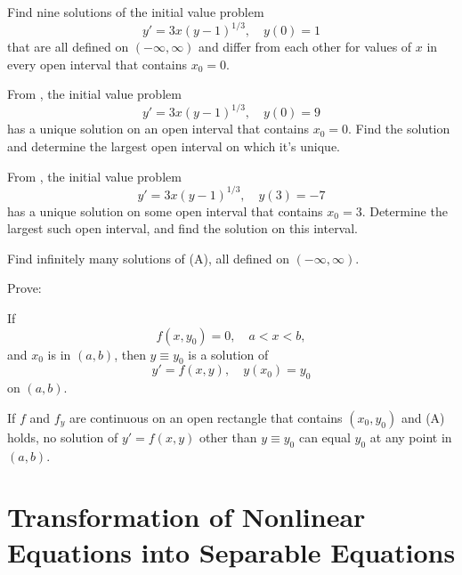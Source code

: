 \begin{exerciselist}
\item\label{exer:2.3.18}Find nine solutions of the initial value problem
\[
y'=3x(y-1)^{1/3}, \quad y(0)=1
\]
that are all defined on $(-\infty,\infty)$ and differ from each other
for values of  $x$ in every open interval that contains $x_0=0$.

\item\label{exer:2.3.19}From , the initial
value
problem
 \[
y'=3x(y-1)^{1/3}, \quad y(0)=9
\]
has a unique solution on an open interval that contains  $x_0=0$. Find the
solution and determine the largest open interval on which it's unique.

\item\label{exer:2.3.20}\begin{alist}
\item %
 From ,
the initial value problem
\[
 y'=3x(y-1)^{1/3}, \quad y(3)=-7\tag{A}
\]
 has a unique solution on some open interval that contains $x_0=3$.
Determine
the largest such open interval, and find the solution on this interval.
\item %
 Find infinitely many solutions of (A), all defined
on
$(-\infty,\infty)$.
\end{alist}


\item\label{exer:2.3.21}Prove:
\begin{alist}
\item %
If
\[
f(x,y_0) = 0,\quad a<x<b,\tag{A}
\]
and  $x_0$ is in  $(a,b)$,
then $y\equiv y_0$ is a solution of
\[
y'=f(x,y), \quad y(x_0)=y_0
\]
on $(a,b)$.
\item %
If $f$ and $f_y$ are continuous on an open rectangle
that contains $(x_0,y_0)$ and (A) holds, no
solution of $y'=f(x,y)$ other than $y\equiv y_0$ can equal $y_0$ at
any point in $(a,b)$.
\end{alist}
\end{exerciselist}


\section[running={Transformation of Nonlinear Equations}]{Transformation of Nonlinear Equations into Separable Equations}
\label{sec:transform_separable}

